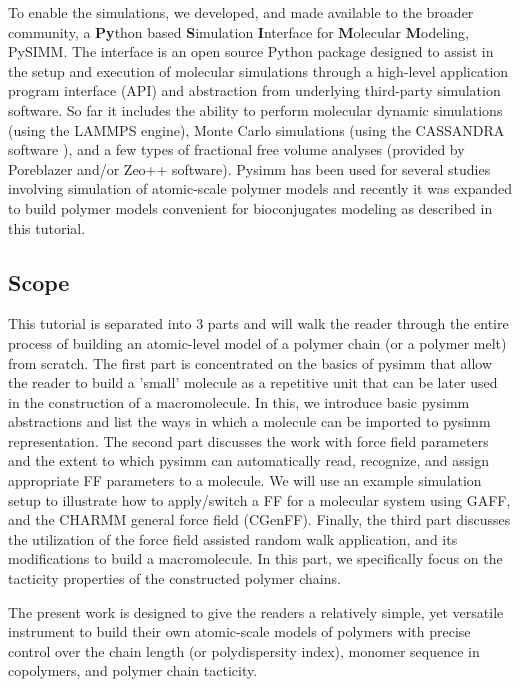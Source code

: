 \documentclass[9pt,tutorial]{livecoms}
\begin{document}
To enable the simulations, we developed, and made available to the broader community, a \textbf{Py}thon based \textbf{S}imulation \textbf{I}nterface for \textbf{M}olecular \textbf{M}odeling, PySIMM. The interface is an open source Python package designed to assist in the setup and execution of molecular simulations through a high-level application program interface (API) and abstraction from underlying third-party simulation software. So far it includes the ability to perform molecular dynamic simulations (using the LAMMPS engine\cite{lammps}), Monte Carlo simulations (using the CASSANDRA software \cite{cassandra}), and a few types of fractional free volume analyses (provided by Poreblazer \cite{pblazer} and/or Zeo++ \cite{zeopp} software). Pysimm has been used for several studies involving simulation of atomic-scale polymer models \cite{Rukmani2019_pegda, song2020, anstine2020effects} and recently it was expanded \cite{pysimm_upd2} to build polymer models convenient for bioconjugates modeling as described in this tutorial. 

\subsection{Scope}

This tutorial is separated into 3 parts and will walk the reader through the entire process of building an atomic-level model of a polymer chain (or a polymer melt) from scratch. The first part is concentrated on the basics of pysimm that allow the reader to build a 'small' molecule as a repetitive unit that can be later used in the construction of a macromolecule. In this, we introduce basic pysimm abstractions and list the ways in which a molecule can be imported to pysimm representation. 
The second part discusses the work with force field parameters and the extent to which pysimm can automatically read, recognize, and assign appropriate FF parameters to a molecule. We will use an example simulation setup to illustrate how to apply/switch a FF for a molecular system using  GAFF, and the CHARMM general force field (CGenFF). Finally, the third part discusses the utilization of the force field assisted random walk application, and its modifications to build a macromolecule. In this part, we specifically focus on the tacticity properties of the constructed polymer chains. 

The present work is designed to give the readers a relatively simple, yet versatile instrument to build their own atomic-scale models of polymers with precise control over the chain length (or polydispersity index), monomer sequence in copolymers, and polymer chain tacticity. 
\end{document}
